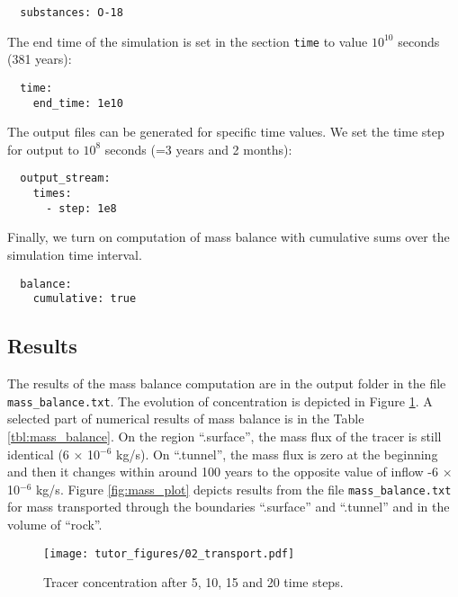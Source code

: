 \begin{verbatim}
  substances: O-18
\end{verbatim}

The end time of the simulation is set in the section \texttt{time} to
value \(10^{10}\) seconds (381 years):

\begin{verbatim}
  time:
    end_time: 1e10
\end{verbatim}

The output files can be generated for specific time values. We set the
time step for output to \(10^8\) seconds (=3 years and 2 months):

\begin{verbatim}
  output_stream:
    times:
      - step: 1e8
\end{verbatim}

Finally, we turn on computation of mass balance with cumulative sums
over the simulation time interval.

\begin{verbatim}
  balance:
    cumulative: true
\end{verbatim}

\subsection{Results}

The results of the mass balance computation are in the output folder in
the file \texttt{mass\_balance.txt}. The evolution of concentration is
depicted in Figure \ref{fig:transport}. A selected part of numerical
results of mass balance is in the Table \ref{tbl:mass_balance}. On the
region ``.surface'', the mass flux of the tracer is still identical (6 ×
10\({}^{-6}\) kg/s). On ``.tunnel'', the mass flux is zero at the
beginning and then it changes within around 100 years to the opposite
value of inflow -6 × 10\({}^{-6}\) kg/s. Figure \ref{fig:mass_plot}
depicts results from the file \texttt{mass\_balance.txt} for mass
transported through the boundaries ``.surface'' and ``.tunnel'' and in
the volume of ``rock''.

\begin{figure}[htbp]
\centering
\texttt{[image: tutor\_figures/02\_transport.pdf]}
\caption{Tracer concentration after 5, 10, 15 and 20 time
steps.\label{fig:transport}}
\end{figure}

